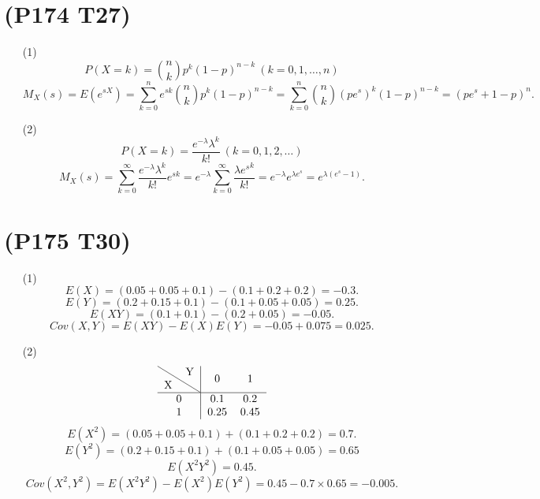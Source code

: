 \documentclass{article}
\begin{document}
\section{(P174 T27)}  %
\begin{enumerate}
    \item [(1)]
    \[
        P (X=k)    
        = \binom{n}{k} p^{k} {(1-p)}^{n-k} \ (k=0,1,\ldots,n)
    \]
    \[
      M_X (s)
      = E(e^{sX}) 
      = \sum\limits_{k=0}^{n} e^{sk} \binom{n}{k} p^{k} {(1-p)}^{n-k}
      = \sum\limits_{k=0}^{n} \binom{n}{k} {(p e^{s})}^{k} {(1-p)}^{n-k}
      = {(p e^{s} + 1 - p)}^{n}.
    \]
    \item [(2)]
    \[
        P (X=k)
        = \frac{e^{-\lambda} \lambda^{k}}{k!} \ (k=0,1,2,\ldots)    
    \]
    \[
        M_X (s)
        = \sum\limits_{k=0}^{\infty} \frac{e^{-\lambda} \lambda^{k}}{k!} e^{sk}
        = e^{-\lambda} \sum\limits_{k=0}^{\infty} \frac{ {\lambda e^{s}}^{k}}{k!}
        = e^{-\lambda} e^{\lambda e^{s}}    
        = e^{\lambda (e^{s} - 1)} .
    \]
\end{enumerate}

\section{(P175 T30)}  %
\begin{enumerate}
    \item [(1)]
    \[
        E(X)
        = (0.05 + 0.05 + 0.1) - (0.1 + 0.2 + 0.2)
        = -0.3 .     
    \]
    \[
        E(Y)
        = (0.2 + 0.15 + 0.1) - (0.1 + 0.05 + 0.05)
        = 0.25 .    
    \]
    \[
        E(XY)
        = (0.1 +0.1) - (0.2 + 0.05)
        = -0.05 .    
    \]
    \[
        Cov(X,Y)
        = E(XY) - E(X) E(Y)
        = -0.05 + 0.075
        = 0.025 .
    \]
    \item [(2)]
    \[
        \begin{tabular}{c|cc}
            \diagbox{X}{Y} & 0 & 1 \\
            \hline
            0 & 0.1 & 0.2 \\
            1 & 0.25 & 0.45 
        \end{tabular}
    \]
    \[
        E(X^2)
        = (0.05 + 0.05 + 0.1) + (0.1 + 0.2 + 0.2)    
        = 0.7.
    \]
    \[
        E(Y^2)
        = (0.2 + 0.15 + 0.1) + (0.1 + 0.05 + 0.05)    
        = 0.65
    \]
    \[
        E(X^2 Y^2)
        = 0.45 .  
    \]
    \[
        Cov(X^2 ,Y^2)
        = E(X^2 Y^2) - E(X^2) E(Y^2)
        = 0.45 - 0.7\times 0.65
        = -0.005.
    \]
\end{enumerate}
\end{document}
